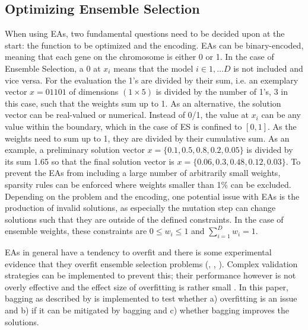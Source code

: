 










\subsection{Optimizing Ensemble Selection}
\label{subop}
When using EAs, two fundamental questions need to be decided upon at the start: the function to be optimized and the encoding. EAs can be binary-encoded, meaning that each gene on the chromosome is either 0 or 1. In the case of Ensemble Selection, a 0 at $x_i$ means that the model $i \in 1,\dots D$ is not included and vice versa. For the evaluation the 1's are divided by their sum, i.e. an exemplary vector $x = {01101}$ of dimensions $(1\times 5)$ is divided by the number of 1's, 3 in this case, such that the weights sum up to 1. As an alternative, the solution vector can be real-valued or numerical. Instead of 0/1, the value at $x_i$ can be any value within the boundary, which in the case of ES is confined to $[0,1]$. As the weights need to sum up to 1, they are divided by their cumulative sum. As an example, a preliminary solution vector $x = \{0.1, 0.5, 0.8, 0.2, 0.05\}$ is divided by its sum 1.65 so that the final solution vector is $x = \{0.06, 0.3, 0.48, 0.12, 0.03\}$. To prevent the EAs from including a large number of arbitrarily small weights, sparsity rules can be enforced where weights smaller than 1\% can be excluded. 
Depending on the problem and the encoding, one potential issue with EAs is the production of invalid solutions, as especially the mutation step can change solutions such that they are outside of the defined constraints. In the case of ensemble weights, these constraints are $0 \leq w_i \leq 1$ and $\sum_{i = 1}^{D} w_i = 1$. 

EAs in general have a tendency to overfit and there is some experimental evidence that they overfit ensemble selection problems (\cite{Robilliard2002}, \cite{radtke2006impact}, \cite{dos2009overfitting}). Complex validation strategies can be implemented to prevent this; their performance however is not overly effective and the effect size of overfitting is rather small \cite[p. 1424]{dos2008overfitting}. In this paper, bagging as described by \cite{caruana2004ensemble} is implemented to test whether a) overfitting is an issue and b) if it can be mitigated by bagging and c) whether bagging improves the solutions.

